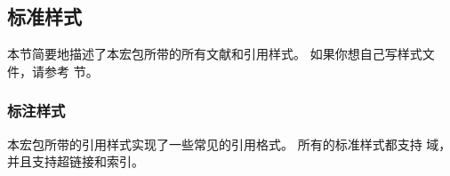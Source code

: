 \subsection{标准样式}%
\label{use:xbx}


本节简要地描述了本宏包所带的所有文献和引用样式。
如果你想自己写样式文件，请参考  节。

\subsubsection{标注样式}%
\label{use:xbx:cbx}


本宏包所带的引用样式实现了一些常见的引用格式。
所有的标准样式都支持  域，并且支持超链接和索引。


